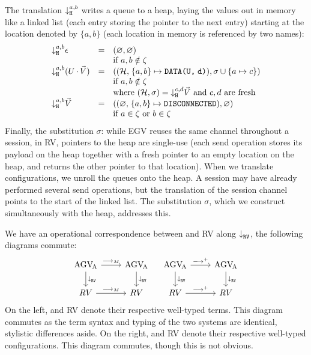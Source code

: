 \documentclass[sigplan,screen,review]{acmart}
\begin{document}
The translation $\mtrh[a,b]{}$ writes a queue to a heap, laying the values out in memory like a linked list (each entry storing the pointer to the next entry) starting at the location denoted by $\{a,b\}$ (each location in memory is referenced by two names):
\[
  \begin{array}{lcl}
    \mtrh[a,b]{\gvVecEmp}
    & = & (\rvHeapEmp, \varnothing)
    \\ && \text{if }\tm{a},\tm{b}\notin\zeta
    \\
    \mtrh[a,b]{\parens{\tm{U}\gvVecAdd\gvVec{V}}}
    & = & ((\rvHeapData{\rvHeap{H}}{a}{b}{\rvMemData{U}{d}}), \sigma \cup \{\tm{a}\mapsto\tm{c}\})
    \\ && \text{if }\tm{a},\tm{b}\notin\zeta
    \\ && \text{where }(\rvHeap{H}, \sigma) = \mtrh[c,d]{\gvVec{V}}
          \text{ and }\tm{c},\tm{d}\text{ are fresh}
    \\
    \mtrh[a,b]{\gvVec{V}}
    & = & ((\rvHeapDisc{\rvHeapEmp}{a}{b}), \varnothing)
    \\ && \text{if }\tm{a}\in\zeta\text{ or }\tm{b}\in\zeta
  \end{array}
\]
Finally, the substitution $\sigma$: while EGV reuses the same channel throughout a session, in RV, pointers to the heap are single-use (each send operation stores its payload on the heap together with a fresh pointer to an empty location on the heap, and returns the other pointer to that location). 
When we translate configurations, we unroll the queues onto the heap. A session may have already performed several send operations, but the translation of the session channel points to the start of the linked list. The substitution $\sigma$, which we construct simultaneously with the heap, addresses this.

We have an operational correspondence between \affineAGV and RV along $\mtr{}$, \ie the following diagrams commute:
\[
  \begin{tikzcd}
    \affineAGV
    \rar{\gvRedArrPure}
    \dar{\mtr{}}
    &
    \affineAGV
    \dar{\mtr{}}
    \\
    RV
    \rar{\gvRedArrPure}
    &
    RV
  \end{tikzcd}
  \quad
  \begin{tikzcd}
    \affineAGV
    \rar{\gvRedArr^{+}}
    \dar{\mtr{}}
    &
    \affineAGV
    \dar{\mtr{}}
    \\
    RV
    \rar{\gvRedArr^{+}}
    &
    RV
  \end{tikzcd}
\]
On the left, \affineAGV and RV denote their respective well-typed terms. This diagram commutes as the term syntax and typing of the two systems are identical, stylistic differences aside.
On the right, \affineAGV and RV denote their respective well-typed configurations. This diagram commutes, though this is not obvious.





\end{document}
